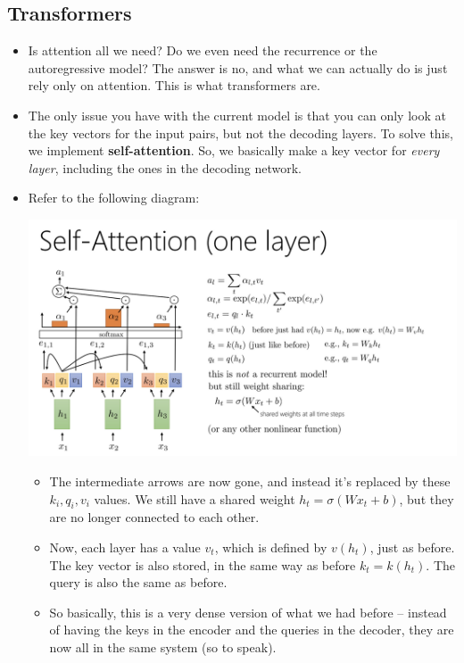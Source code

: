 \subsection{Transformers}
\begin{itemize}
	\item Is attention all we need? Do we even need the recurrence or the
		autoregressive model? The answer is no, and what we can actually do is just
		rely only on attention. This is what transformers are. 
	\item The only issue you have with the current model is that you can only look at
		the key vectors for the input pairs, but not the decoding layers. To solve
		this, we implement \textbf{self-attention}. So, we basically make a key
		vector for \textit{every layer}, including the ones in the decoding network.
	\item Refer to the following diagram:
		\begin{center}
			\includegraphics[scale=0.5]{images/lec11-5.png}
		\end{center}
		\begin{itemize}
			\item The intermediate arrows are now gone, and instead it's replaced by
				these \( k_i, q_i, v_i \) values. We still have a shared weight \(
				h_t = \sigma(W x_t + b) \), but they are no longer connected to each
				other. 
			\item Now, each layer has a value \( v_t \), which is defined by \(
				v(h_t) \), just as before. The key vector is also stored, in the same
				way as before \( k_t = k(h_t) \). The query is also the same as
				before. 
			\item So basically, this is a very dense version of what we had before --
				instead of having the keys in the encoder and the queries in the
				decoder, they are now all in the same system (so to speak). 

\end{itemize}
\end{itemize}
